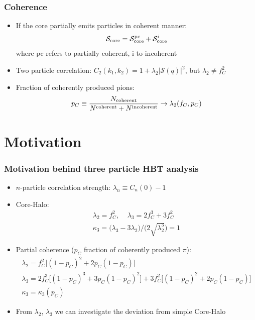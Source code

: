 \documentclass{beamer}
\begin{document}
\begin{frame}
\frametitle{Coherence}
\begin{itemize}
\setlength{\itemsep}{28pt}
\item If the core partially emits particles in coherent manner:
\begin{equation*}
\mathcal{S}_{\rm core}=\mathcal{S}_{\rm core}^{\rm pc}+\mathcal{S}_{\rm core}^{i}
\end{equation*}
where pc refers to partially coherent, i to incoherent

\item Two particle correlation: $C_2(k_1, k_2) =  1+\lambda_2|\mathcal{S}(q)|^2$, but $\lambda_2 \neq f_C^2$
\item Fraction of coherently produced pions:
\begin{equation*}
p_C \equiv \frac{N_{\rm coherent}}{N^{\rm coherent}+N^{\rm incoherent}} \rightarrow \lambda_2(f_C, p_C)
\end{equation*}
\end{itemize}

\end{frame}

\section{Motivation}
\begin{frame}
\frametitle{Motivation behind three particle HBT analysis}
\begin{itemize}
\setlength{\itemsep}{20pt}
\item $n$-particle correlation strength: $\lambda_n \equiv C_n(0)-1$
\item Core-Halo: \vspace*{-15pt}
	\begin{align*}
		\lambda_2=f_C^2,\;\;\;\;\lambda_3 = 2f_C^3+3f_C^2 \\ 
		\kappa_3=\big(\lambda_3-3\lambda_2\big)/\big(2\sqrt{\lambda_2^3}\big)=1
	\end{align*}
\item Partial coherence ($p_C$ fraction of coherently produced $\pi$): 
	\begin{gather*}
		\lambda_2=f_C^2\big[(1-p_C)^2+2p_C(1-p_C)\big]\\
		\lambda_3=2f_C^3\big[(1-p_C)^3+3p_C(1-p_C)^2\big]+3f_C^2\big[(1-p_C)^2+2p_C(1-p_C)\big]\nonumber\\
		\kappa_3 = \kappa_3(p_C)
	\end{gather*}
\item From $\lambda_2$, $\lambda_3$ we can investigate the deviation from simple Core-Halo
\end{itemize}
\end{frame}
\end{document}
